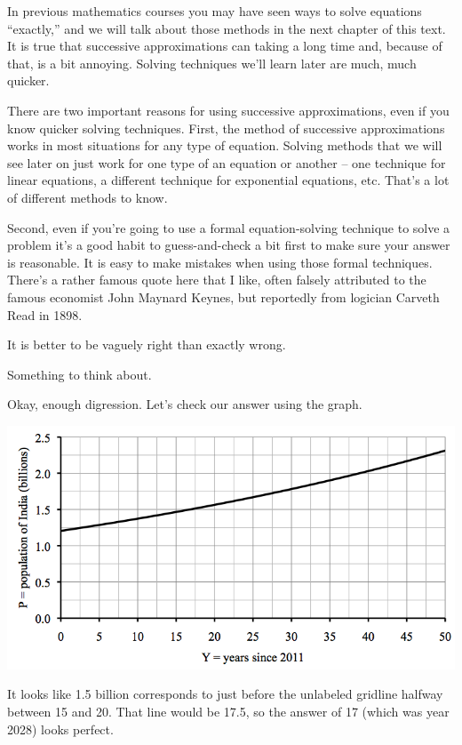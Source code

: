 In previous mathematics courses you may have seen ways to solve equations ``exactly,'' and we will talk about those methods in the next chapter of this text.  It is true that successive approximations can taking a long time and, because of that, is a bit annoying.  Solving techniques we'll learn later are much, much quicker.

There are two important reasons for using successive approximations, even if you know quicker solving techniques.   First, the method of successive approximations works in most situations for any type of equation.  Solving methods that we will see later on just work for one type of an equation or another -- one technique for linear equations, a different technique for exponential equations, etc.  That's a lot of different methods to know.  

Second, even if you're going to use a formal equation-solving technique to solve a problem it's a good habit to guess-and-check a bit first to make sure your answer is reasonable.  It is easy to make mistakes when using those formal techniques. There's a rather famous quote here that I like, often falsely attributed to the famous economist John Maynard Keynes, but reportedly from logician Carveth Read in 1898.
\begin{center}
It is better to be vaguely right than exactly wrong.
\end{center}
Something to think about.

Okay, enough digression.  Let's check our answer using the graph.
\begin{center}
 {\includegraphics [width=6in] {indiapop.png}}
\end{center}
It looks like 1.5 billion corresponds to just before the unlabeled gridline halfway between 15 and 20.  That line would be 17.5, so the answer of 17 (which was year 2028) looks perfect.


%
